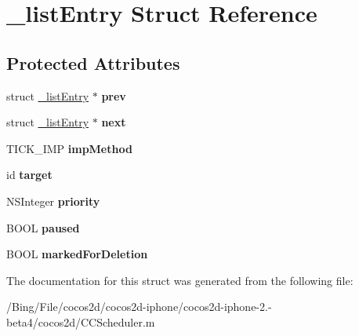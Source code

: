 \hypertarget{struct__list_entry}{\section{\-\_\-list\-Entry Struct Reference}
\label{struct__list_entry}
}
\subsection*{Protected Attributes}
\begin{DoxyCompactItemize}
\item 
\hypertarget{struct__list_entry_a3b2315c239a97de7798badcb0b66203d}{struct \hyperlink{struct__list_entry}{\-\_\-list\-Entry} $\ast$ {\bfseries prev}}\label{struct__list_entry_a3b2315c239a97de7798badcb0b66203d}

\item 
\hypertarget{struct__list_entry_afbaca78f6b0462638a5dd8802dbbb028}{struct \hyperlink{struct__list_entry}{\-\_\-list\-Entry} $\ast$ {\bfseries next}}\label{struct__list_entry_afbaca78f6b0462638a5dd8802dbbb028}

\item 
\hypertarget{struct__list_entry_a447fb6dfadb1c630cc4960eda12312a9}{T\-I\-C\-K\-\_\-\-I\-M\-P {\bfseries imp\-Method}}\label{struct__list_entry_a447fb6dfadb1c630cc4960eda12312a9}

\item 
\hypertarget{struct__list_entry_a105c25c9a8c3734c90f7e358e77c1c09}{id {\bfseries target}}\label{struct__list_entry_a105c25c9a8c3734c90f7e358e77c1c09}

\item 
\hypertarget{struct__list_entry_a9b69678055581f68d25f87d6638308ac}{N\-S\-Integer {\bfseries priority}}\label{struct__list_entry_a9b69678055581f68d25f87d6638308ac}

\item 
\hypertarget{struct__list_entry_ae5b6c4fbe176bd209176b61b7edb58b0}{B\-O\-O\-L {\bfseries paused}}\label{struct__list_entry_ae5b6c4fbe176bd209176b61b7edb58b0}

\item 
\hypertarget{struct__list_entry_a857f00df788f5fcab40fa9a582831d12}{B\-O\-O\-L {\bfseries marked\-For\-Deletion}}\label{struct__list_entry_a857f00df788f5fcab40fa9a582831d12}

\end{DoxyCompactItemize}


The documentation for this struct was generated from the following file\-:\begin{DoxyCompactItemize}
\item 
/\-Bing/\-File/cocos2d/cocos2d-\/iphone/cocos2d-\/iphone-\/2.-\/beta4/cocos2d/C\-C\-Scheduler.\-m\end{DoxyCompactItemize}
